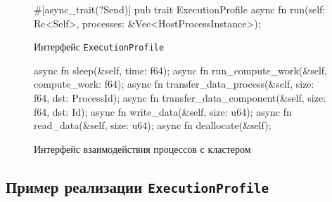 \documentclass[t]{beamer}  %
\begin{document}
	\begin{frame}[fragile]
		\frametitle{\insertsection} 
		\framesubtitle{\insertsubsection}
		
\begin{figure}[H]
	\centering
	\hspace*{-0.5cm}
	\begin{minipage}{1.15\linewidth}
    \scriptsize
\begin{rustcode}
#[async_trait(?Send)]
pub trait ExecutionProfile {
  async fn run(self: Rc<Self>, processes: &Vec<HostProcessInstance>);
}
\end{rustcode}
	\end{minipage}
\caption*{Интерфейс \texttt{ExecutionProfile}}
\end{figure}

\vspace{-1cm}

\begin{figure}[H]
	\centering
	\hspace*{-0.6cm}
	\begin{minipage}{1.15\linewidth}
    \scriptsize
\begin{rustcode}
async fn sleep(&self, time: f64);
async fn run_compute_work(&self, compute_work: f64);
async fn transfer_data_process(&self, size: f64, dst: ProcessId);
async fn transfer_data_component(&self, size: f64, dst: Id);
async fn write_data(&self, size: u64);
async fn read_data(&self, size: u64);
async fn deallocate(&self);
\end{rustcode}
\end{minipage}
\caption*{Интерфейс взаимодействия процессов с кластером}
\end{figure}



	\end{frame}


	\subsection{Пример реализации \texttt{ExecutionProfile}}
\end{document}
